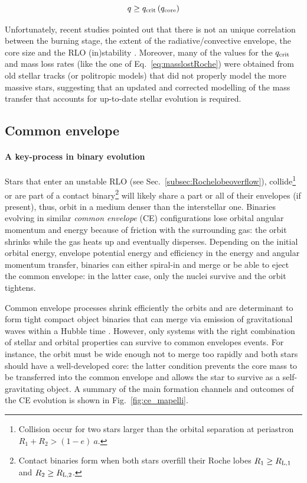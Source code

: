 \documentclass[a4paper,titlepage]{book}     	%
\newcommand{\rlone}{\ensuremath{R_\textup{L,1}}}
\newcommand{\rltwo}{\ensuremath{R_\textup{L,2}}}
\begin{document}
\begin{equation}\label{eq:qcrit}
	q \geq q_\textup{crit} \left(q_\textup{core}\right)
\end{equation}

Unfortunately, recent studies pointed out that there is not an unique correlation between the burning stage, the extent of the radiative/convective envelope, the core size and the RLO (in)stability \cite{klencki2020_mtproblems}. Moreover, many of the values for the $q_{\rm crit}$ and mass loss rates (like the one of Eq.\ \ref{eq:masslostRoche}) were obtained from old stellar tracks (or politropic models) that did not properly model the more massive stars, suggesting that an updated and corrected modelling of the mass transfer that accounts for up-to-date stellar evolution is required.



\subsection{Common envelope}\label{subsec:Commonenvelope}
\paragraph{A key-process in binary evolution} Stars that enter an unstable RLO (see Sec.\ \ref{subsec:Rochelobeoverflow}), collide\footnote{Collision occur for two stars larger than the orbital separation at periastron $R_1 + R_2 > (1-e)~a$.} or are part of a contact binary\footnote{Contact binaries form when both stars overfill their Roche lobes $R_1 \geq \rlone$ and $R_2 \geq \rltwo$.} will likely share a part or all of their envelopes (if present), thus, orbit in a medium denser than the interstellar one. Binaries evolving in similar \emph{common envelope} (CE) configurations lose orbital angular momentum and energy because of friction with the surrounding gas: the orbit shrinks while the gas heats up and eventually disperses.  Depending on the initial orbital energy, envelope potential energy and efficiency in the energy and angular momentum transfer, binaries can either spiral-in and merge or be able to eject the common envelope: in the latter case, only the nuclei survive and the orbit tightens.

Common envelope processes shrink efficiently the orbits and are determinant to form tight compact object binaries that can merge via emission of gravitational waves within a Hubble time \cite{spera2019_mergingBBH}. However, only systems with the right combination of stellar and orbital properties can survive to common envelopes events. For instance, the orbit must be wide enough not to merge too rapidly and both stars should have a well-developed core: the latter condition prevents the core mass to be transferred into the common envelope and allows the star to survive as a self-gravitating object. A summary of the main formation channels and outcomes of the CE evolution is shown in Fig.\ \ref{fig:ce_mapelli}.
\end{document}
